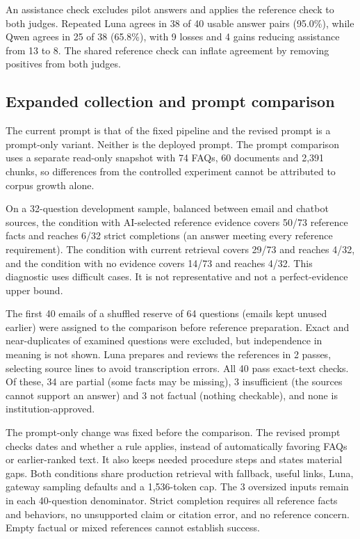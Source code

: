 \documentclass[a4paper,10pt,twocolumn]{article}
\begin{document}
An assistance check excludes pilot answers and applies the reference check to both judges. Repeated Luna agrees in 38 of 40 usable answer pairs (95.0\%), while Qwen agrees in 25 of 38 (65.8\%), with 9 losses and 4 gains reducing assistance from 13 to 8. The shared reference check can inflate agreement by removing positives from both judges.\subsection{Expanded collection and prompt comparison}\label{sec:followup}
The current prompt is that of the fixed pipeline and the revised prompt is a prompt-only variant. Neither is the deployed prompt. The prompt comparison uses a separate read-only snapshot with 74 FAQs, 60 documents and 2,391 chunks, so differences from the controlled experiment cannot be attributed to corpus growth alone.

On a 32-question development sample, balanced between email and chatbot sources, the condition with AI-selected reference evidence covers 50/73 reference facts and reaches 6/32 strict completions (an answer meeting every reference requirement). The condition with current retrieval covers 29/73 and reaches 4/32, and the condition with no evidence covers 14/73 and reaches 4/32. This diagnostic uses difficult cases. It is not representative and not a perfect-evidence upper bound.

The first 40 emails of a shuffled reserve of 64 questions (emails kept unused earlier) were assigned to the comparison before reference preparation. Exact and near-duplicates of examined questions were excluded, but independence in meaning is not shown. Luna prepares and reviews the references in 2 passes, selecting source lines to avoid transcription errors. All 40 pass exact-text checks. Of these, 34 are partial (some facts may be missing), 3 insufficient (the sources cannot support an answer) and 3 not factual (nothing checkable), and none is institution-approved.

The prompt-only change was fixed before the comparison. The revised prompt checks dates and whether a rule applies, instead of automatically favoring FAQs or earlier-ranked text. It also keeps needed procedure steps and states material gaps. Both conditions share production retrieval with fallback, useful links, Luna, gateway sampling defaults and a 1,536-token cap. The 3 oversized inputs remain in each 40-question denominator. Strict completion requires all reference facts and behaviors, no unsupported claim or citation error, and no reference concern. Empty factual or mixed references cannot establish success.
\end{document}
